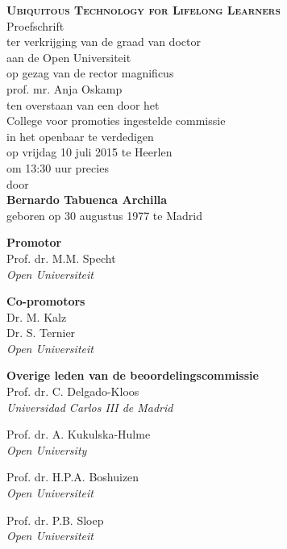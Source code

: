 \documentclass[normalheadings,tablecaptionabove,twoside,openright,chapterprefix,halfparskip,fontsize=10pt,numbers=noenddot]{scrbook} %
\begin{document}
\begin{titlepage}
	\newpage
	\null\vspace*{15.25em}
	\center
	\huge
	\textbf{\textsc{Ubiquitous Technology for Lifelong Learners}}\\
	\vspace{2em}
	\normalsize
	Proefschrift\\
	\vspace{1em}
	ter verkrijging  van de graad van doctor \\
	aan de Open Universiteit \\
	op gezag van de rector magnificus \\
	prof. mr. Anja Oskamp \\
	ten overstaan van een door het \\
	College voor promoties ingestelde commissie \\
	in het openbaar te verdedigen\\
	\vspace{1em}
	op vrijdag 10 juli 2015 te Heerlen \\
	om 13:30 uur precies\\
	\vspace{1em}
	door\\
	\vspace{1em}
	\textbf{Bernardo Tabuenca Archilla}\\
	geboren op 30 augustus 1977 te Madrid\\
	\vfill\null
	
	\newpage
	\null\vfill
	\raggedright
	\textbf{Promotor} \\
	Prof. dr. M.M. Specht \\
	\textit{Open Universiteit} \par
	\textbf{Co-promotors} \\
	Dr. M. Kalz \\
	Dr. S. Ternier \\	
	\textit{Open Universiteit} \par
	\textbf{Overige leden van de beoordelingscommissie}\\
	Prof. dr. C. Delgado-Kloos \\
	\textit{Universidad Carlos III de Madrid} \par
	Prof. dr. A. Kukulska-Hulme \\
	\textit{Open University}  \par
	Prof. dr. H.P.A. Boshuizen \\
	\textit{Open Universiteit} \par
	Prof. dr. P.B. Sloep \\
	\textit{Open Universiteit}

	\newpage
	\null\vspace*{15.25em}
	\begin{quote}
	\end{quote}
	\vfill\null
	\clearpage{\pagestyle{empty}\cleardoublepage}
\end{titlepage}
	
\end{document}
